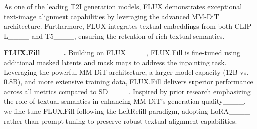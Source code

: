 As one of the leading T2I generation models, FLUX demonstrates exceptional text-image alignment capabilities by leveraging the advanced MM-DiT architecture. Furthermore, FLUX integrates textual embeddings from both CLIP-L____ and T5____, ensuring the retention of rich textual semantics.


\noindent\textbf{FLUX.Fill____.}
Building on FLUX____, FLUX.Fill is fine-tuned using additional masked latents and mask maps to address the inpainting task. Leveraging the powerful MM-DiT architecture, a larger model capacity (12B vs. 0.8B), and more extensive training data, FLUX.Fill delivers superior performance across all metrics compared to SD____.
Inspired by prior research emphasizing the role of textual semantics in enhancing MM-DiT's generation quality____, we fine-tune FLUX.Fill following the LeftRefill paradigm, adopting LoRA____ rather than prompt tuning to preserve robust textual alignment capabilities.